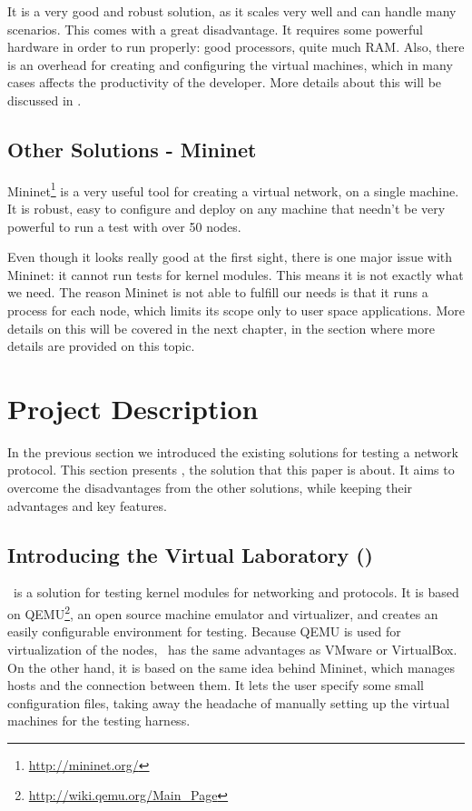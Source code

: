It is a very good and robust solution, as it scales very well and can handle many scenarios.
This comes with a great disadvantage.
It requires some powerful hardware in order to run properly: good processors, quite much RAM.
Also, there is an overhead for creating and configuring the virtual machines, which in many cases affects the productivity of the developer.
More details about this will be discussed in .

\subsection{Other Solutions - Mininet}
\label{sub-sec:proto-testing-mininet}

Mininet\footnote{\url{http://mininet.org/}} is a very useful tool for creating a virtual network, on a single machine.
It is robust, easy to configure and deploy on any machine that needn't be very powerful to run a test with over 50 nodes.

Even though it looks really good at the first sight, there is one major issue with Mininet: it cannot run tests for kernel modules.
This means it is not exactly what we need.
The reason Mininet is not able to fulfill our needs is that it runs a process for each node, which limits its scope only to user space applications.
More details on this will be covered in the next chapter, in the section  where more details are provided on this topic.

\section{Project Description}
\label{sec:proj-desc}

In the previous section we introduced the existing solutions for testing a network protocol.
This section presents \project, the solution that this paper is about.
It aims to overcome the disadvantages from the other solutions, while keeping their advantages and key features.

\subsection{Introducing the Virtual Laboratory (\project)}
\label{sub-sec:proj-desc-intro}

\project\ is a solution for testing kernel modules for networking and protocols.
It is based on QEMU\footnote{\url{http://wiki.qemu.org/Main_Page}}, an open source machine emulator and virtualizer, and creates an easily configurable environment for testing.
Because QEMU is used for virtualization of the nodes, \project\ has the same advantages as VMware or VirtualBox.
On the other hand, it is based on the same idea behind Mininet, which manages hosts and the connection between them.
It lets the user specify some small configuration files, taking away the headache of manually setting up the virtual machines for the testing harness.

